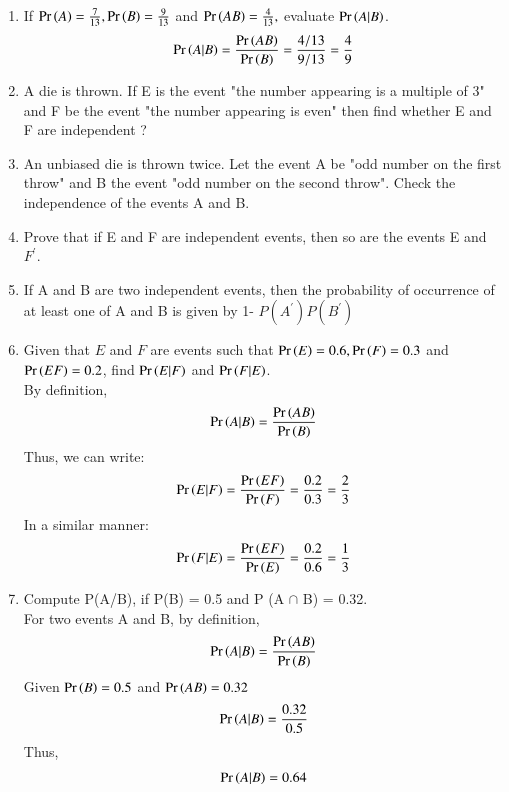 \begin{enumerate}[label=\thesection.\arabic*.,ref=\thesection.\theenumi]
\item If $\Pr\left(A\right)= \frac{7}{13}, \Pr\left(B\right)=\frac{9}{13}$ and $\Pr\left(AB\right)=\frac{4}{13},$ evaluate $\Pr\left(A|B\right)$.
\\
\solution 
\begin{align}
\Pr\left(A|B\right) = \frac{\Pr\left(AB\right)}{\Pr\left(B\right)} = \frac{4/13}{9/13} = \frac{4}{9}
\end{align}
\item A die is thrown. If E is the event "the number appearing is a multiple of 3" and F be the event "the number appearing is even" then find whether E and F are independent ?\\
\solution


\item An unbiased die is thrown twice. Let the event A be "odd number on the first throw" and B the event "odd number on the second throw". Check the independence of the events A and B.\\
\solution



\item Prove that if E and F are independent events, then so are the events E and $F^{'}$.\\
\solution


\item If A and B are two independent events, then the probability of occurrence of at least one of A and B is given by 1- $P(A^{'}) P(B^{'})$\\
\solution

\item Given that $E$ and $F$ are events such that $\Pr\left(E\right) = 0.6, \Pr\left(F\right) = 0.3$ and $\Pr\left(EF\right) = 0.2$, find $\Pr\left(E|F\right)$ and $\Pr\left(F|E\right)$.\\
\solution
By definition, 
\begin{align}
\Pr\left(A|B\right) = \frac{\Pr\left(AB\right)}{\Pr\left(B\right)}
\end{align}
Thus, we can write:
\begin{align}
\Pr\left(E|F\right) = \frac{\Pr\left(EF\right)}{\Pr\left(F\right)} = \frac{0.2}{0.3} = \frac{2}{3}
\end{align}
In a similar manner:
\begin{align}
\Pr\left(F|E\right) = \frac{\Pr\left(EF\right)}{\Pr\left(E\right)} = \frac{0.2}{0.6} = \frac{1}{3}
\end{align}
%
\item Compute P(A/B), if P(B) = 0.5 and P (A $\cap$ B) = 0.32.\\
\solution
For two events A and B, by definition,
\begin{align}
\Pr\left(A|B\right) = \frac{\Pr\left(AB\right)}{\Pr\left(B\right)}
\end{align}
Given $\Pr\left(B\right) = 0.5$ and $\Pr\left(AB\right) = 0.32$
\begin{align}
\Pr\left(A | B\right) = \frac{0.32}{0.5}
\end{align}
Thus,
\begin{align}
\Pr\left(A | B\right) = 0.64
\end{align}


\end{enumerate}
